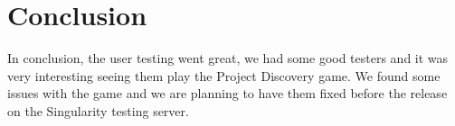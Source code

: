\section{Conclusion}\label{sec:conclusion}
In conclusion, the user testing went great, we had some good testers and it was very interesting seeing them play the Project Discovery game. We found some issues with the game and we are planning to have them fixed before the release on the Singularity testing server.